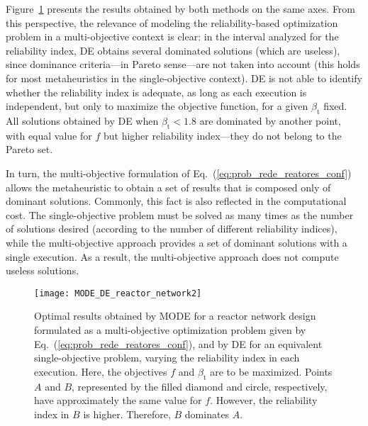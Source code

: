 \documentclass[final,5p,times,twocolumn,numbers]{elsarticle}
\begin{document}
Figure~\ref{fig:MODE_DE_reactor_network} presents the results obtained by both methods on the same axes. From this perspective, the relevance of modeling the reliability-based optimization problem in a multi-objective context is clear: in the interval analyzed for the reliability index, DE obtains several dominated solutions (which are useless), since dominance criteria---in Pareto sense---are not taken into account (this holds for most metaheuristics in the single-objective context). DE is not able to identify whether the reliability index is adequate, as long as each execution is independent, but only to maximize the objective function, for a given $ \beta_{\mathrm{t}} $ fixed. All solutions obtained by DE when $ \beta_{\mathrm{t}} < 1.8 $ are dominated by another point, with equal value for $ f $ but higher reliability index---they do not belong to the Pareto set.

In turn, the multi-objective formulation of Eq.~(\ref{eq:prob_rede_reatores_conf}) allows the metaheuristic to obtain a set of results that is composed only of dominant solutions. Commonly, this fact is also reflected in the computational cost. The single-objective problem must be solved as many times as the number of solutions desired (according to the number of different reliability indices), while the multi-objective approach provides a set of dominant solutions with a single execution. As a result, the multi-objective approach does not compute useless solutions.

\begin{figure}[!ht]
    \centering
    \texttt{[image: MODE\_DE\_reactor\_network2]}
    \caption{Optimal results obtained by MODE for a reactor network design formulated as a multi-objective optimization problem given by Eq.~(\ref{eq:prob_rede_reatores_conf}), and by DE for an equivalent single-objective problem, varying the reliability index in each execution. Here, the objectives $ f $ and $ \beta_{\mathrm{t}} $ are to be maximized. Points $ A $ and $ B $, represented by the filled diamond and circle, respectively, have approximately the same value for $ f $. However, the reliability index in $ B $ is higher. Therefore, $ B $ dominates $ A $.}
    \label{fig:MODE_DE_reactor_network}
\end{figure}
\end{document}
